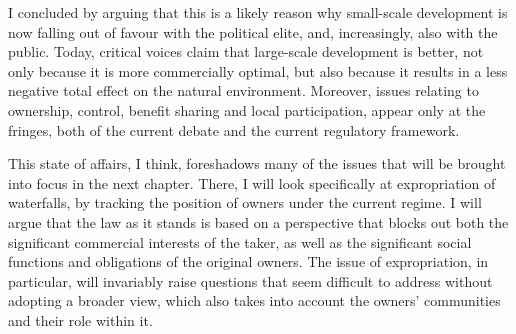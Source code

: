 I concluded by arguing that this is a likely reason why small-scale development is now falling out of favour with the political elite, and, increasingly, also with the public. Today, critical voices claim that large-scale development is better, not only because it is more commercially optimal, but also because it results in a less negative total effect on the natural environment. Moreover, issues relating to ownership, control, benefit sharing and local participation, appear only at the fringes, both of the current debate and the current regulatory framework.

This state of affairs, I think, foreshadows many of the issues that will be brought into focus in the next chapter. There, I will look specifically at expropriation of waterfalls, by tracking the position of owners under the current regime. I will argue that the law as it stands is based on a perspective that blocks out both the significant commercial interests of the taker, as well as the significant social functions and obligations of the original owners. The issue of expropriation, in particular, will invariably raise questions that seem difficult to address without adopting a broader view, which also takes into account the owners' communities and their role within it.